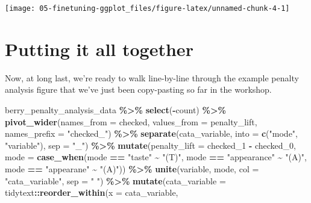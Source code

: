 \documentclass[
]{book}
\newenvironment{Shaded}{\begin{snugshade}}{\end{snugshade}}
\newcommand{\AttributeTok}[1]{\textcolor[rgb]{0.13,0.29,0.53}{#1}}
\newcommand{\FunctionTok}[1]{\textcolor[rgb]{0.13,0.29,0.53}{\textbf{#1}}}
\newcommand{\NormalTok}[1]{#1}
\newcommand{\SpecialCharTok}[1]{\textcolor[rgb]{0.81,0.36,0.00}{\textbf{#1}}}
\newcommand{\StringTok}[1]{\textcolor[rgb]{0.31,0.60,0.02}{#1}}
\begin{document}
\begin{center}\texttt{[image: 05-finetuning-ggplot\_files/figure-latex/unnamed-chunk-4-1]} \end{center}

\hypertarget{putting-it-all-together}{%
\section{Putting it all together}\label{putting-it-all-together}}

Now, at long last, we're ready to walk line-by-line through the example penalty analysis figure that we've just been copy-pasting so far in the workshop.

\begin{Shaded}
\begin{Highlighting}[]
\NormalTok{berry\_penalty\_analysis\_data }\SpecialCharTok{\%\textgreater{}\%}
  \FunctionTok{select}\NormalTok{(}\SpecialCharTok{{-}}\NormalTok{count) }\SpecialCharTok{\%\textgreater{}\%}
  \FunctionTok{pivot\_wider}\NormalTok{(}\AttributeTok{names\_from =}\NormalTok{ checked,}
              \AttributeTok{values\_from =}\NormalTok{ penalty\_lift,}
              \AttributeTok{names\_prefix =} \StringTok{"checked\_"}\NormalTok{) }\SpecialCharTok{\%\textgreater{}\%}
  \FunctionTok{separate}\NormalTok{(cata\_variable, }
           \AttributeTok{into =} \FunctionTok{c}\NormalTok{(}\StringTok{"mode"}\NormalTok{, }\StringTok{"variable"}\NormalTok{), }
           \AttributeTok{sep =} \StringTok{"\_"}\NormalTok{) }\SpecialCharTok{\%\textgreater{}\%}
  \FunctionTok{mutate}\NormalTok{(}\AttributeTok{penalty\_lift =}\NormalTok{ checked\_1 }\SpecialCharTok{{-}}\NormalTok{ checked\_0,}
         \AttributeTok{mode =} \FunctionTok{case\_when}\NormalTok{(mode }\SpecialCharTok{==} \StringTok{"taste"} \SpecialCharTok{\textasciitilde{}} \StringTok{"(T)"}\NormalTok{,}
\NormalTok{                          mode }\SpecialCharTok{==} \StringTok{"appearance"} \SpecialCharTok{\textasciitilde{}} \StringTok{"(A)"}\NormalTok{,}
\NormalTok{                          mode }\SpecialCharTok{==} \StringTok{"appearane"} \SpecialCharTok{\textasciitilde{}} \StringTok{"(A)"}\NormalTok{)) }\SpecialCharTok{\%\textgreater{}\%}
  \FunctionTok{unite}\NormalTok{(variable, mode, }\AttributeTok{col =} \StringTok{"cata\_variable"}\NormalTok{, }\AttributeTok{sep =} \StringTok{" "}\NormalTok{) }\SpecialCharTok{\%\textgreater{}\%}
  \FunctionTok{mutate}\NormalTok{(}\AttributeTok{cata\_variable =}\NormalTok{ tidytext}\SpecialCharTok{::}\FunctionTok{reorder\_within}\NormalTok{(}\AttributeTok{x =}\NormalTok{ cata\_variable,}

\end{Highlighting}
\end{Shaded}
\end{document}
